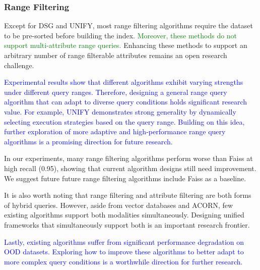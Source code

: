 \documentclass[sigconf, nonacm]{acmart}
\begin{document}
{	\subsubsection{\textbf{Range Filtering}}
	
	Except for DSG and UNIFY, most range filtering algorithms require the dataset to be pre-sorted before building the index. \textcolor{green}{Moreover, these methods do not support multi-attribute range queries. }Enhancing these methods to support an arbitrary number of range filterable attributes remains an open research challenge.
	

\textcolor{blue}{
Experimental results show that different algorithms exhibit varying strengths under different query ranges. Therefore, designing a general range query algorithm that can adapt to diverse query conditions holds significant research value. For example, UNIFY demonstrates strong generality by dynamically selecting execution strategies based on the query range. Building on this idea, further exploration of more adaptive and high-performance range query algorithms is a promising direction for future research.}
	
In our experiments, many range filtering algorithms perform worse than Faiss at high recall (0.95), showing that current algorithm designs still need improvement. We suggest future future range filtering algorithms include Faiss as a baseline.
	
	
	It is also worth noting that range filtering and attribute filtering are both forms of hybrid queries. However, aside from vector databases and ACORN, few existing algorithms support both modalities simultaneously. Designing unified frameworks that simultaneously support both is an important research frontier. 
	
	\textcolor{blue}{
	Lastly, existing algorithms suffer from significant performance degradation on OOD datasets. Exploring how to improve these algorithms to better adapt to more complex query conditions is a worthwhile direction for further research.}
	
}
\end{document}

